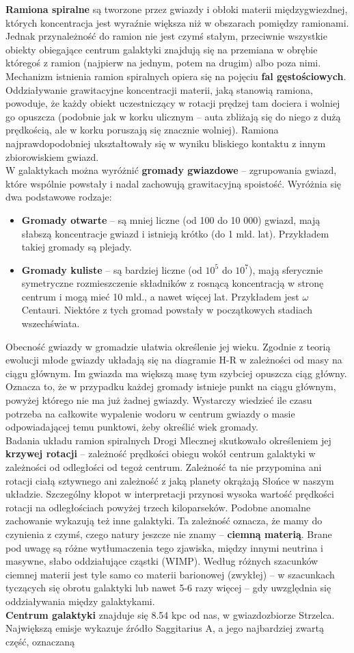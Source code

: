 \documentclass[../index.tex]{subfiles}
\begin{document}
        \textbf{Ramiona spiralne} są tworzone przez gwiazdy i obłoki materii międzygwiezdnej, których koncentracja jest wyraźnie większa niż w obszarach pomiędzy ramionami. Jednak przynależność do ramion nie jest czymś stałym, przeciwnie wszystkie obiekty obiegające centrum galaktyki znajdują się na przemiana w obrębie któregoś z ramion (najpierw na jednym, potem na drugim) albo poza nimi. Mechanizm istnienia ramion spiralnych opiera się na pojęciu \textbf{fal gęstościowych}. Oddziaływanie grawitacyjne koncentracji materii, jaką stanowią ramiona, powoduje, że każdy obiekt uczestniczący w rotacji prędzej tam dociera i wolniej go opuszcza (podobnie jak w korku ulicznym – auta zbliżają się do niego z dużą prędkością, ale w korku poruszają się znacznie wolniej). Ramiona najprawdopodobniej ukształtowały się w wyniku bliskiego kontaktu z innym zbiorowiskiem gwiazd.\\
        W galaktykach można wyróżnić \textbf{gromady gwiazdowe} – zgrupowania gwiazd, które wspólnie powstały i nadal zachowują grawitacyjną spoistość. Wyróżnia się dwa podstawowe rodzaje:
        \begin{itemize}
            \item \textbf{Gromady otwarte} – są mniej liczne (od 100 do 10 000) gwiazd, mają słabszą koncentracje gwiazd i istnieją krótko (do 1 mld. lat). Przykładem takiej gromady są plejady.
            \item \textbf{Gromady kuliste} – są bardziej liczne (od \(10^{5}\) do \(10^{7}\)), mają sferycznie symetryczne rozmieszczenie składników z rosnącą koncentracją w stronę centrum i mogą mieć 10 mld., a nawet więcej lat. Przykładem jest \(\omega\) Centauri. Niektóre z tych gromad powstały w początkowych stadiach wszechświata.
        \end{itemize}
        Obecność gwiazdy w gromadzie ułatwia określenie jej wieku. Zgodnie z teorią ewolucji młode gwiazdy układają się na diagramie H-R w zależności od masy na ciągu głównym. Im gwiazda ma większą masę tym szybciej opuszcza ciąg główny. Oznacza to, że w przypadku każdej gromady istnieje punkt na ciągu głównym, powyżej którego nie ma już żadnej gwiazdy. Wystarczy wiedzieć ile czasu potrzeba na całkowite wypalenie wodoru w centrum gwiazdy o masie odpowiadającej temu punktowi, żeby określić wiek gromady.\\
        Badania układu ramion spiralnych Drogi Mlecznej skutkowało określeniem jej \textbf{krzywej rotacji} – zależność prędkości obiegu wokół centrum galaktyki w zależności od odległości od tegoż centrum. Zależność ta nie przypomina ani rotacji ciałą sztywnego ani zależność z jaką planety okrążają Słońce w naszym układzie. Szczególny kłopot w interpretacji przynosi wysoka wartość prędkości rotacji na odległościach powyżej trzech kiloparseków. Podobne anomalne zachowanie wykazują też inne galaktyki. Ta zależność oznacza, że mamy do czynienia z czymś, czego natury jeszcze nie znamy – \textbf{ciemną materią}. Brane pod uwagę są różne wytłumaczenia tego zjawiska, między innymi neutrina i masywne, słabo oddziałujące cząstki (WIMP). Według różnych szacunków ciemnej materii jest tyle samo co materii barionowej (zwykłej) – w szacunkach tyczących się obrotu galaktyki lub nawet 5-6 razy więcej – gdy uwzględnia się oddziaływania między galaktykami.\\
        \textbf{Centrum galaktyki} znajduje się 8.54 kpc od nas, w gwiazdozbiorze Strzelca. Największą emisje wykazuje źródło Saggitarius A, a jego najbardziej zwartą część, oznaczaną 
\end{document}
